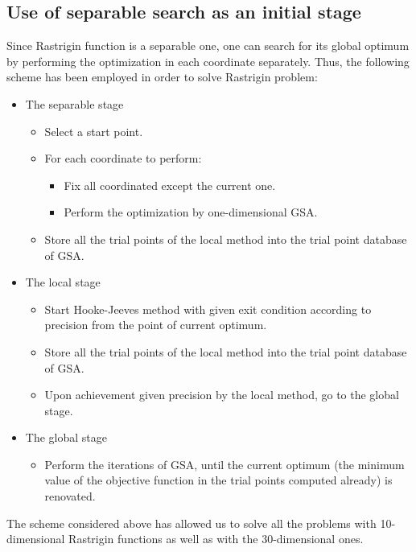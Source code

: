\documentclass{llncs}
\begin{document}
\subsection{Use of separable search as an initial stage}\label{separable}

Since Rastrigin function is a separable one, one can search for its global optimum by performing the optimization in each coordinate separately. Thus, the following scheme has been employed in order to solve Rastrigin problem:


\begin{itemize}
	\item The separable stage 
	\begin{itemize}
		\item Select a start point.
		\item For each coordinate to perform:
		\begin{itemize}
			\item Fix all coordinated except the current one.
			\item Perform the optimization by one-dimensional GSA. 
		\end{itemize}
		\item Store all the trial points of the local method into the trial point database of GSA.		
	\end{itemize}
	\item The local stage 
	\begin{itemize}
		\item Start Hooke-Jeeves method with given exit condition according to precision from the point of current optimum.
		\item Store all the trial points of the local method into the trial point database of GSA.
		\item Upon achievement given precision by the local method, go to the global stage.
	\end{itemize}
\item The global stage
	\begin{itemize}
		\item Perform the iterations of GSA, until the current optimum (the minimum value of the objective function in the trial points computed already) is renovated.
	\end{itemize}	
\end{itemize}

The scheme considered above has allowed us to solve all the problems with 10-dimensional Rastrigin functions as well as with the 30-dimensional ones.
\end{document}
